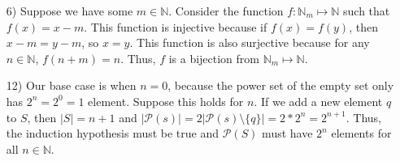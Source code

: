\documentclass[11pt]{article}
\newcommand{\N}{\mathbb{N}}    %
\begin{document}
\begin{enumerate}
    \item[6)] Suppose we have some $m \in \N$. Consider the function $f:\N_m \mapsto \N$ such that $f(x) = x-m$. This function is injective because if $f(x) = f(y)$, then $x-m = y-m$, so $x=y$. This function is also surjective because for any $n \in \N$, $f(n+m) = n$. Thus, $f$ is a bijection from $\N_m \mapsto \N$.
    \item[12)] Our base case is when $n=0$, because the power set of the empty set only has $2^n=2^0=1$ element. Suppose this holds for $n$. If we add a new element $q$ to $S$, then $\vert S \vert = n+1$ and $\vert \mathcal{P}(s) \vert = 2 \vert \mathcal{P}(s) \setminus \{q \}\vert = 2*2^n = 2^{n+1} $. Thus, the induction hypothesis must be true and $\mathcal{P}(S)$ must have $2^n$ elements for all $n \in \N$.
  \end{enumerate}
\end{document}
